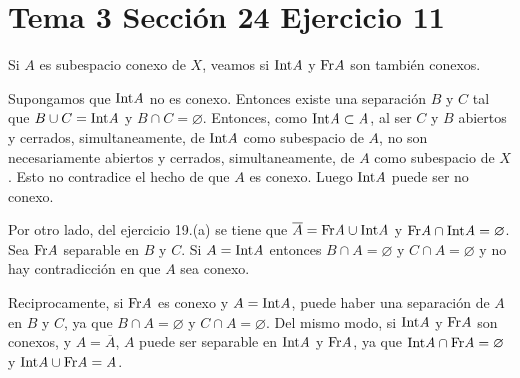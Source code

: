 \documentclass{article}
\begin{document}
\section{Tema 3 Sección 24 Ejercicio 11}
Si $A$ es subespacio conexo de $X$, veamos si $\rm Int \it A$ y $\rm Fr \it A$ son también conexos.

Supongamos que $\rm Int \it A$ no es conexo. Entonces existe una separación $B$ y $C$ tal que $B\cup C=\rm Int \it A$ y $B\cap C=\varnothing$. Entonces, como $\rm Int \it A \subset A $, al ser $C$ y $B$ abiertos y  cerrados, simultaneamente, de $\rm Int \it A$ como subespacio de $A$, no son necesariamente abiertos y cerrados, simultaneamente, de $A$ como subespacio de $X$. Esto no contradice el hecho de que $A$ es conexo. Luego $\rm Int \it A$ puede ser no conexo.

Por otro lado, del ejercicio 19.(a) se tiene que $\overline{A}=\rm Fr \it A\cup \rm Int \it A$ y $\rm Fr \it A\cap \rm Int \it A=\varnothing$. Sea $\rm Fr \it A$ separable en $B$ y $C$. Si $A=\rm Int \it A$ entonces $B\cap A=\varnothing$ y $C\cap A=\varnothing$ y no hay contradicción en que $A$ sea conexo.

Reciprocamente, si $\rm Fr \it A$ es conexo y $A=\rm Int \it A$, puede haber una separación de $A$ en $B$ y $C$, ya que $B\cap A=\varnothing$ y $C\cap A=\varnothing$. Del mismo modo, si $\rm Int \it A$ y $\rm Fr \it A$ son conexos, y $A=\overline{A}$, $A$ puede ser separable en $\rm Int \it A$ y $\rm Fr \it A$, ya que $\rm Int \it A \cap \rm Fr \it A=\varnothing$ y $\rm Int \it A \cup \rm Fr \it A=A$.
\end{document}
